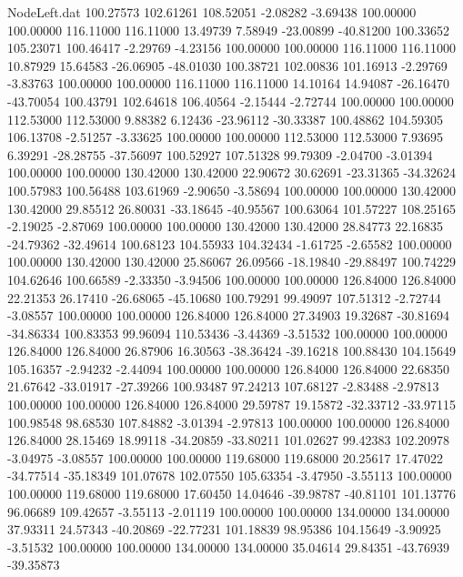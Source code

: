 \begin{filecontents}{NodeLeft.dat}
 100.27573  102.61261  108.52051    -2.08282   -3.69438  100.00000  100.00000  116.11000  116.11000   13.49739    7.58949  -23.00899  -40.81200
 100.33652  105.23071  100.46417    -2.29769   -4.23156  100.00000  100.00000  116.11000  116.11000   10.87929   15.64583  -26.06905  -48.01030
 100.38721  102.00836  101.16913    -2.29769   -3.83763  100.00000  100.00000  116.11000  116.11000   14.10164   14.94087  -26.16470  -43.70054
 100.43791  102.64618  106.40564    -2.15444   -2.72744  100.00000  100.00000  112.53000  112.53000    9.88382    6.12436  -23.96112  -30.33387
 100.48862  104.59305  106.13708    -2.51257   -3.33625  100.00000  100.00000  112.53000  112.53000    7.93695    6.39291  -28.28755  -37.56097
 100.52927  107.51328   99.79309    -2.04700   -3.01394  100.00000  100.00000  130.42000  130.42000   22.90672   30.62691  -23.31365  -34.32624
 100.57983  100.56488  103.61969    -2.90650   -3.58694  100.00000  100.00000  130.42000  130.42000   29.85512   26.80031  -33.18645  -40.95567
 100.63064  101.57227  108.25165    -2.19025   -2.87069  100.00000  100.00000  130.42000  130.42000   28.84773   22.16835  -24.79362  -32.49614
 100.68123  104.55933  104.32434    -1.61725   -2.65582  100.00000  100.00000  130.42000  130.42000   25.86067   26.09566  -18.19840  -29.88497
 100.74229  104.62646  100.66589    -2.33350   -3.94506  100.00000  100.00000  126.84000  126.84000   22.21353   26.17410  -26.68065  -45.10680
 100.79291   99.49097  107.51312    -2.72744   -3.08557  100.00000  100.00000  126.84000  126.84000   27.34903   19.32687  -30.81694  -34.86334
 100.83353   99.96094  110.53436    -3.44369   -3.51532  100.00000  100.00000  126.84000  126.84000   26.87906   16.30563  -38.36424  -39.16218
 100.88430  104.15649  105.16357    -2.94232   -2.44094  100.00000  100.00000  126.84000  126.84000   22.68350   21.67642  -33.01917  -27.39266
 100.93487   97.24213  107.68127    -2.83488   -2.97813  100.00000  100.00000  126.84000  126.84000   29.59787   19.15872  -32.33712  -33.97115
 100.98548   98.68530  107.84882    -3.01394   -2.97813  100.00000  100.00000  126.84000  126.84000   28.15469   18.99118  -34.20859  -33.80211
 101.02627   99.42383  102.20978    -3.04975   -3.08557  100.00000  100.00000  119.68000  119.68000   20.25617   17.47022  -34.77514  -35.18349
 101.07678  102.07550  105.63354    -3.47950   -3.55113  100.00000  100.00000  119.68000  119.68000   17.60450   14.04646  -39.98787  -40.81101
 101.13776   96.06689  109.42657    -3.55113   -2.01119  100.00000  100.00000  134.00000  134.00000   37.93311   24.57343  -40.20869  -22.77231
 101.18839   98.95386  104.15649    -3.90925   -3.51532  100.00000  100.00000  134.00000  134.00000   35.04614   29.84351  -43.76939  -39.35873

\end{filecontents}

